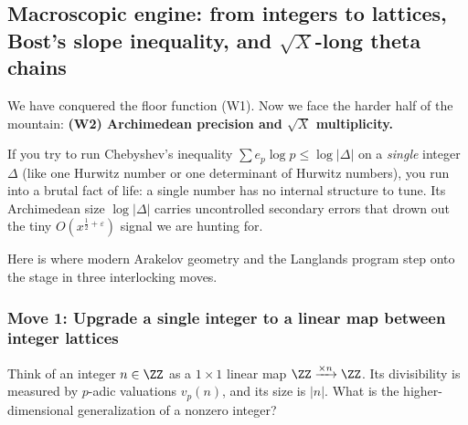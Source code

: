 \subsection{Macroscopic engine: from integers to lattices, Bost's slope inequality, and \(\sqrt{X}\)-long theta chains}

We have conquered the floor function (W1). Now we face the harder half of the mountain: \textbf{(W2) Archimedean precision and \(\sqrt{X}\) multiplicity.}

If you try to run Chebyshev's inequality \(\sum e_p \log p \le \log |\Delta|\) on a \emph{single} integer \(\Delta\) (like one Hurwitz number or one determinant of Hurwitz numbers), you run into a brutal fact of life: a single number has no internal structure to tune. Its Archimedean size \(\log|\Delta|\) carries uncontrolled secondary errors that drown out the tiny \(O(x^{\frac{1}{2}+\varepsilon})\) signal we are hunting for.

Here is where modern Arakelov geometry and the Langlands program step onto the stage in three interlocking moves.

\subsubsection*{Move 1: Upgrade a single integer to a linear map between integer lattices}

Think of an integer \(n \in \ZZ\) as a \(1 \times 1\) linear map \(\ZZ \xrightarrow{\times n} \ZZ\). Its divisibility is measured by \(p\)-adic valuations \(v_p(n)\), and its size is \(|n|\). What is the higher-dimensional generalization of a nonzero integer?

